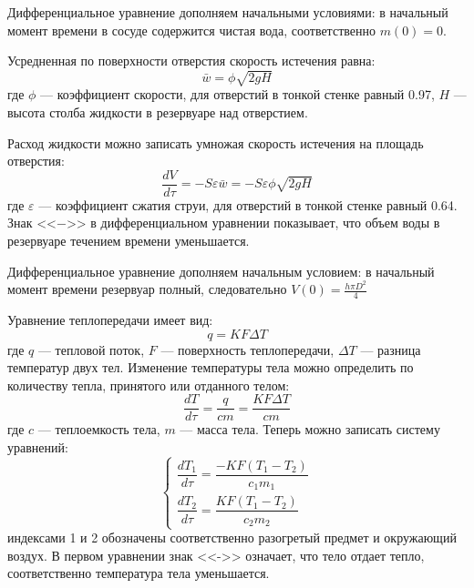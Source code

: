 Дифференциальное уравнение дополняем начальными условиями: в начальный момент времени в сосуде содержится чистая вода, соответственно $m(0)=0.$


Усредненная по поверхности отверстия скорость истечения равна:
\begin{equation}
\bar{w}=\phi \sqrt{2gH}
\end{equation} 
где $\phi$ --- коэффициент скорости, для отверстий в тонкой стенке равный 0.97, $H$ --- высота столба жидкости в резервуаре над отверстием.

Расход жидкости можно записать умножая скорость истечения на площадь отверстия:
\begin{equation}
\dfrac{d V}{d \tau} = - S \varepsilon \bar{w}= -S \varepsilon  \phi \sqrt{2gH}
\end{equation}
где $\varepsilon$ --- коэффициент сжатия струи, для отверстий в тонкой стенке равный 0.64. Знак  <<$-$>> в дифференциальном уравнении показывает,  что объем воды в резервуаре течением времени уменьшается. 

Дифференциальное уравнение дополняем начальным условием: в начальный момент времени резервуар полный, следовательно $V(0)=\frac{h \pi D^2}{4}$



Уравнение теплопередачи имеет вид:
\begin{equation}
q=K F \Delta T
\end{equation}
где $q$ --- тепловой поток, $F$ --- поверхность теплопередачи, $\Delta T$ --- разница температур двух тел. Изменение температуры тела можно определить по количеству тепла, принятого или отданного телом:
\begin{equation}
\dfrac{d T}{d \tau}=\dfrac{q}{c m} = \dfrac{K F \Delta T}{c m}
\end{equation}
где $c$ --- теплоемкость тела, $m$ --- масса тела.
Теперь можно записать систему уравнений:
\begin{equation}
\begin{cases}
\dfrac{d T_1}{d \tau} = \dfrac{-K F (T_1-T_2)}{c_1 m_1} \\
\dfrac{d T_2}{d \tau} = \dfrac{K F (T_1-T_2)}{c_2 m_2}
\end{cases}
\end{equation}
индексами 1 и 2 обозначены соответственно разогретый предмет и окружающий воздух. В первом уравнении знак <<->> означает, что тело отдает тепло, соответственно температура тела уменьшается.

